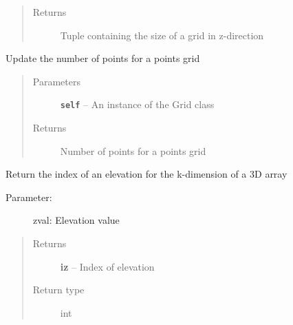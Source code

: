\documentclass[letterpaper,10pt,english]{sphinxmanual}
\begin{document}
\begin{fulllineitems}
\begin{fulllineitems}
\begin{quote}
\begin{description}
\item[{Returns}] \leavevmode
Tuple containing the size of a grid in z-direction

\end{description}\end{quote}

\end{fulllineitems}


\begin{fulllineitems}
\label{hyvr:hyvr.hyvr.grid.Grid.get_points}
Update the number of points for a points grid
\begin{quote}\begin{description}
\item[{Parameters}] \leavevmode
\textbf{\texttt{self}} -- An instance of the Grid class

\item[{Returns}] \leavevmode
Number of points for a points grid

\end{description}\end{quote}

\end{fulllineitems}


\begin{fulllineitems}
\label{hyvr:hyvr.hyvr.grid.Grid.idx_z}
Return the index of an elevation for the k-dimension of a 3D array
\begin{description}
\item[{Parameter:}] \leavevmode
zval:               Elevation value

\end{description}
\begin{quote}\begin{description}
\item[{Returns}] \leavevmode
\textbf{iz} -- Index of elevation

\item[{Return type}] \leavevmode
int

\end{description}\end{quote}

\end{fulllineitems}


\end{fulllineitems}
\end{document}
